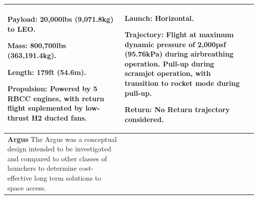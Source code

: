 {\begin{landscape}
\begin{xltabular}{\linewidth}{|X|X|X|}
			\textbf{Payload:} 20,000lbs (9,071.8kg) to LEO. 
			
			\textbf{Mass:} 800,700lbs (363,191.4kg).
			
			\textbf{Length:} 179ft (54.6m). 
			
			
			
			\textbf{Propulsion:} Powered by 5 RBCC engines, with return flight suplemented by low-thrust H2 ducted fans. 
			
			&\small {} 
			
			\textbf{Launch:} Horizontal.
			
			\textbf{Trajectory:} Flight at maximum dynamic pressure of 2,000psf (95.76kPa) during airbreathing operation. Pull-up during scramjet operation, with transition to rocket mode during pull-up. 
			
			\textbf{Return:} No Return trajectory considered.
			
			\\
			\hline \small\textbf{Argus}\cite{Argus} \newline\newline
			The Argus was a conceptual design intended to be investigated and compared to other classes of launchers to determine cost-effective long term solutions to space access.  
			&\small
			

\end{xltabular}
\end{landscape}}
